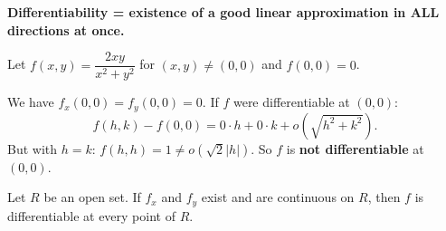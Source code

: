 \documentclass[11pt]{report}
\begin{document}
\medskip

\textbf{Differentiability = existence of a good linear approximation in ALL directions at once.}

\begin{example}
Let $f(x, y) = \dfrac{2xy}{x^2 + y^2}$ for $(x, y) \neq (0, 0)$ and $f(0, 0) = 0$.

We have $f_x(0, 0) = f_y(0, 0) = 0$. If $f$ were differentiable at $(0, 0)$:
\[
f(h, k) - f(0, 0) = 0 \cdot h + 0 \cdot k + o(\sqrt{h^2 + k^2}).
\]
But with $h = k$: $f(h, h) = 1 \neq o(\sqrt{2}|h|)$. So $f$ is \textbf{not differentiable} at $(0, 0)$.
\end{example}

\begin{theorem}
Let $R$ be an open set. If $f_x$ and $f_y$ exist and are continuous on $R$, then $f$ is differentiable at every point of $R$.
\end{theorem}
\end{document}
